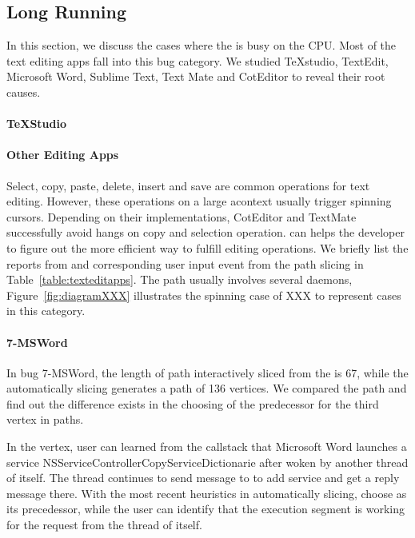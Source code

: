 \subsection{Long Running}

In this section, we discuss the cases where the \spinningnode is busy on the
CPU. Most of the text editing apps fall into this bug category. We studied
TeXstudio, TextEdit, Microsoft Word, Sublime Text, Text Mate and CotEditor to
reveal their root causes.

\paragraph{TeXStudio}


\paragraph{Other Editing Apps}

Select, copy, paste, delete, insert and save are common operations for text
editing. However, these operations on a large acontext usually trigger spinning
cursors. Depending on their implementations, CotEditor and TextMate successfully
avoid hangs on copy and selection operation. \xxx can helps the developer to
figure out the more efficient way to fulfill editing operations. We briefly list
the reports from \spinningnode and corresponding user input event from the path
slicing in Table~\ref{table:texteditapps}. The path usually involves several
daemons, Figure~\ref{fig:diagramXXX} illustrates the spinning case of XXX to
represent cases in this category.

\paragraph{7-MSWord}

In bug 7-MSWord, the length of path interactively sliced from the \spinningnode
is 67, while the automatically slicing generates a path of 136 vertices. We
compared the path and find out the difference exists in the choosing of the
predecessor for the third vertex in paths.

In the vertex, user can learned from the callstack that Microsoft Word launches
a service NSServiceControllerCopyServiceDictionarie after woken by another
thread of itself. The thread continues to send message to  to add
service and get a reply message there. With the most recent heuristics in
automatically slicing, \xxx choose  as its precedessor, while the
user can identify that the execution segment is working for the request from the
thread of itself.

